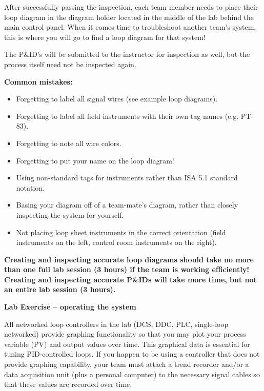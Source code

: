 After successfully passing the inspection, each team member needs to place their loop diagram in the diagram holder located in the middle of the lab behind the main control panel.  When it comes time to troubleshoot another team's system, this is where you will go to find a loop diagram for that system!

The P\&ID's will be submitted to the instructor for inspection as well, but the process itself need not be inspected again.

\vskip 10pt

{\bf Common mistakes:}

\begin{itemize}
\item{} Forgetting to label all signal wires (see example loop diagrams).
\item{} Forgetting to label all field instruments with their own tag names (e.g. PT-83).
\item{} Forgetting to note all wire colors.
\item{} Forgetting to put your name on the loop diagram!
\item{} Using non-standard tags for instruments rather than ISA 5.1 standard notation.
\item{} Basing your diagram off of a team-mate's diagram, rather than closely inspecting the system for yourself.
\item{} Not placing loop sheet instruments in the correct orientation (field instruments on the left, control room instruments on the right).
\end{itemize}

\vskip 10pt

{\bf Creating and inspecting accurate loop diagrams should take no more than one full lab session (3 hours) if the team is working efficiently!  Creating and inspecting accurate P\&IDs will take more time, but not an entire lab session (3 hours).}







\vfil \eject

\noindent
{\bf Lab Exercise -- operating the system}

\vskip 5pt

All networked loop controllers in the lab (DCS, DDC, PLC, single-loop networked) provide graphing functionality so that you may plot your process variable (PV) and output values over time.  This graphical data is essential for tuning PID-controlled loops.  If you happen to be using a controller that does not provide graphing capability, your team must attach a trend recorder and/or a data acquisition unit (plus a personal computer) to the necessary signal cables so that these values are recorded over time.

